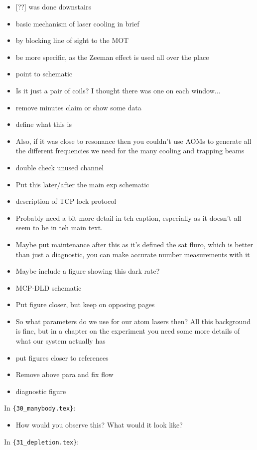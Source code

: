 \begin{itemize}
\item {[??] was done downstairs}
\item {basic mechanism of laser cooling in brief}
\item {by blocking line of sight to the MOT}
\item {be more specific, as the Zeeman effect is used all over the place}
\item {point to schematic}
\item {Is it just a pair of coils? I thought there was one on each window...}
\item {remove minutes claim or show some data}
\item {define what this is}
\item {Also, if it was close to resonance then you couldn't use AOMs to generate all the different frequencies we need for the many cooling and trapping beams}
\item {double check unused channel}
\item {Put this later/after the main exp schematic}
\item {description of TCP lock protocol}
\item {Probably need  a bit more detail in teh caption, especially as it doesn't all seem to be in teh main text.}
\item {Maybe put maintenance after this as it's defined the sat fluro, which is better than just a diagnostic, you can make accurate number measurements with it}
\item {Maybe include a figure showing this dark rate?}
\item {MCP-DLD schematic}
\item {Put figure closer, but keep on opposing pages}
\item {So what parameters do we use for our atom lasers then?  All this background is fine, but in a chapter on the experiment you need some more details of what our system actually has}
\item {put figures closer to references}
\item {Remove above para and fix flow}
\item {diagnostic figure}
\end{itemize}
In \verb|{30_manybody.tex}|:
\begin{itemize}
\item {How would you observe this?  What would it look like?}
\end{itemize}
In \verb|{31_depletion.tex}|:
